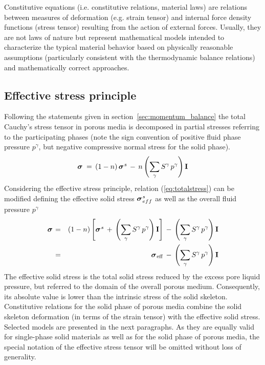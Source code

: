 
Constitutive equations (i.e. constitutive relations, material laws) are relations between measures of deformation (e.g. strain tensor) and internal force density functions (stress tensor) resulting from the action of external forces. Usually, they are not laws of nature but represent mathematical models intended to characterize the typical material behavior based on physically reasonable assumptions (particularly consistent with the thermodynamic balance relations) and mathematically correct approaches.

\subsection{Effective stress principle}
\label{sec:effstress}

Following the statements given in section~\ref{sec:momentum_balance} the total Cauchy's stress tensor in porous media is decomposed in partial stresses referring to the participating phases (note the sign convention of positive fluid phase pressure $p^{\gamma}$, but negative compressive normal stress for the solid phase).
\begin{equation}
\miu{\sigma}{}{}\,=\,(1-n)\,\mio{\sigma}{s}{}\,-\,n
\left(\sum\limits_{\gamma}S^{\gamma}\,p^{\gamma}\right)\mathbf{I}
\label{eq:totalstress}
\end{equation}
Considering the effective stress principle, relation (\ref{eq:totalstress}) can be modified defining the effective solid stress $\mbox{${\mbox{\boldmath${\sigma}$\unboldmath}}_{\:\!eff}^{\:\!s}$}$ as well as the overall fluid pressure $p^{\gamma}$
\begin{eqnarray}
\miu{\sigma}{}{} & = & 
(1-n)\left[
\mio{\sigma}{s}{}\,+\,\left(\sum\limits_{\gamma}S^{\gamma}\,p^{\gamma}\right)\mathbf{I}
\right]
\,-\,\left(\sum\limits_{\gamma}S^{\gamma}\,p^{\gamma}\right)\mathbf{I} \nonumber \\
 & = &
\miu{\sigma}{\mathrm{eff}}{}{}
\,-\,\left(\sum\limits_{\gamma}S^{\gamma}\,p^{\gamma}\right)\mathbf{I}
\label{eq:effect_stress}
\end{eqnarray}
The effective solid stress is the total solid stress reduced by the excess pore liquid pressure, but referred to the domain of the overall porous medium. Consequently, its absolute value is lower than the intrinsic stress of the solid skeleton. Constitutive relations for the solid phase of porous media combine the solid skeleton deformation (in terms of the strain tensor) with the effective solid stress. Selected models are presented in the next paragraphs. As they are equally valid for single-phase solid materials as well as for the solid phase of porous media, the special notation of the effective stress tensor will be omitted without loss of generality.

